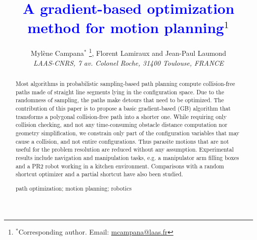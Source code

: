 \documentclass{tADR2e}
\begin{document}
\graphicspath{{images/}}



\title{\textcolor{blue}{A gradient-based optimization method for motion planning}$^{1}$}

\author{Myl\`{e}ne Campana$^{\ast}$ \thanks{$^\ast$Corresponding author. Email: \href{mailto:mcampana@laas.fr}{mcampana@laas.fr}}, Florent Lamiraux and Jean-Paul Laumond
\\\vspace{6pt}
{\em{LAAS-CNRS, 7 av. Colonel Roche, 31400 Toulouse, FRANCE}}
}
\maketitle



\begin{abstract}
Most algorithms in probabilistic sampling-based path planning compute 
collision-free paths made of straight line segments lying in the configuration 
space. Due
to the randomness of sampling, the paths make detours that need to be optimized.
The contribution of this paper is to propose a basic gradient-based (GB) algorithm 
that transforms a polygonal collision-free path into a shorter one.
While requiring only collision 
checking, and not any time-consuming obstacle distance computation nor geometry 
simplification, we constrain only part of the configuration variables 
that may cause a collision, and not entire configurations. Thus parasite motions that 
are not useful for the problem resolution are reduced without any 
assumption.
Experimental results include navigation and manipulation tasks, 
e.g. a manipulator arm filling boxes and a PR2 robot working in a kitchen 
environment. Comparisons with a random shortcut optimizer and a partial 
shortcut have also been studied.



\medskip

\begin{keywords}path optimization; motion planning; robotics
\end{keywords}\medskip

\end{abstract}
\end{document}
